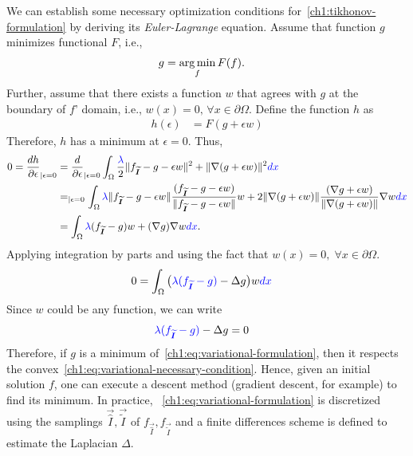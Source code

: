 We can establish some necessary optimization conditions for~\cref{ch1:tikhonov-formulation} by deriving its \emph{Euler-Lagrange} equation. Assume that function $g$ minimizes functional $F$, i.e.,
\begin{align*}
	g &= \operatorname*{arg\,min}_{f}{F(f)}.
\end{align*}
%
Further, assume that there exists a function $w$ that agrees with $g$ at the boundary of $f$' domain, i.e., $w(x)=0,\, \forall x \in \partial \Omega$. Define the function $h$ as
\begin{align*}
	h(\epsilon) &= F(g+\epsilon w)
\end{align*}
%
Therefore, $h$ has a minimum at $\epsilon=0$. Thus,
\begin{align*}
	0 = \frac{dh}{\partial \epsilon}_{| \epsilon=0} &= \frac{d}{\partial \epsilon}_{| \epsilon=0} \int_{\Omega}{ \frac{{\color{blue}{ \lambda }}}{2}\lVert f_{\bm{\widetilde{I}}} - g - \epsilon w\rVert^2 + \lVert \nabla (g + \epsilon w) \rVert^2 {\color{blue}{dx}}}  \\
	&= _{| \epsilon = 0} \int_{\Omega}{ {\color{blue}{ \lambda }}\lVert f_{\bm{\widetilde{I}}} - g - \epsilon w\rVert\frac{(f_{\bm{\widetilde{I}}} - g - \epsilon w) }{\lVert f_{\bm{\widetilde{I}}} - g - \epsilon w\rVert}w + 2\lVert \nabla (g + \epsilon w) \rVert\frac{(\nabla g + \epsilon w)}{\lVert \nabla (g + \epsilon w) \rVert}\nabla w {\color{blue}{dx}}} \\
	&= \int_{\Omega}{ {\color{blue}{ \lambda }}(f_{\bm{\widetilde{I}}} - g)w + (\nabla g)\nabla w {\color{blue}{dx}}}. 	
\end{align*}
%
Applying integration by parts and using the fact that $w(x)=0,\; \forall x \in \partial \Omega$.
\begin{align*}
		0 &= \int_{\Omega}{ \big( {\color{blue}{ \lambda ( f_{\bm{\widetilde{I}}} - g)}} - \Delta g \big)w {\color{blue}{dx}}}
\end{align*}
%
Since $w$ could be any function, we can write
\begin{align}
	{\color{blue}{ \lambda ( f_{\bm{\widetilde{I}}} - g)}} - \Delta g &= 0
	\label{ch1:eq:variational-necessary-condition}
\end{align}
%
%
Therefore, if $g$ is a minimum of~\cref{ch1:eq:variational-formulation}, then it respects the convex~\cref{ch1:eq:variational-necessary-condition}. Hence, given an initial solution $f$, one can execute a descent method (gradient descent, for example) to find its minimum. In practice, ~\cref{ch1:eq:variational-formulation} is discretized using the samplings $\vec{\widehat{I}}, \vec{\widetilde{I}}$ of $f_{\vec{\widehat{I}}},f_{\vec{\widetilde{I}}}$ and a finite differences scheme is defined to estimate the Laplacian $\Delta$.

